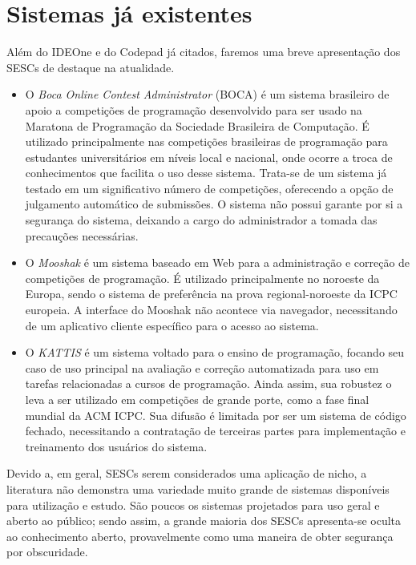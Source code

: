 \documentclass[ruledheader, 12pt]{abnt}
\begin{document}
\section{Sistemas já existentes}

Além do IDEOne e do Codepad já citados, faremos uma breve apresentação dos SESCs de destaque na atualidade.

\begin{itemize}
	\item O \emph{Boca Online Contest Administrator} (BOCA) é um sistema brasileiro \cite{boca2004} de apoio a competições de programação desenvolvido para ser usado na Maratona de Programação da Sociedade Brasileira de Computação. É utilizado principalmente nas competições brasileiras de programação para estudantes universitários em níveis local e nacional, onde ocorre a troca de conhecimentos que facilita o uso desse sistema. Trata-se de um sistema já testado em um significativo número de competições, oferecendo a opção de julgamento automático de submissões. O sistema não possui garante por si a segurança do sistema, deixando a cargo do administrador a tomada das precauções necessárias.
	
	\item O \emph{Mooshak} \cite{mooshak2003} é um sistema baseado em Web para a administração e correção de competições de programação. É utilizado principalmente no noroeste da Europa, sendo o sistema de preferência na prova regional-noroeste da ICPC europeia. A interface do Mooshak não acontece via navegador, necessitando de um aplicativo cliente específico para o acesso ao sistema.
	
	\item O \emph{KATTIS} \cite{kattis2011} é um sistema voltado para o ensino de programação, focando seu caso de uso principal na avaliação e correção automatizada para uso em tarefas relacionadas a cursos de programação. Ainda assim, sua robustez o leva a ser utilizado em competições de grande porte, como a fase final mundial da ACM ICPC. Sua difusão é limitada por ser um sistema de código fechado, necessitando a contratação de terceiras partes para implementação e treinamento dos usuários do sistema.
\end{itemize}

Devido a, em geral, SESCs serem considerados uma aplicação de nicho, a literatura não demonstra uma variedade muito grande de sistemas disponíveis para utilização e estudo. São poucos os sistemas projetados para uso geral e aberto ao público; sendo assim, a grande maioria dos SESCs apresenta-se oculta ao conhecimento aberto, provavelmente como uma maneira de obter segurança por obscuridade.
\end{document}
